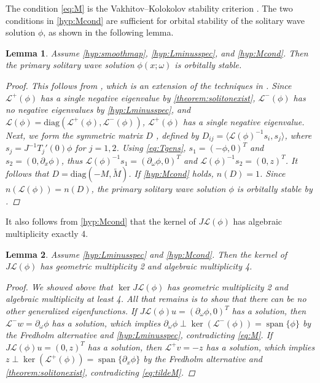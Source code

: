 \documentclass[12pt]{elsarticle}
\def\calL{{\mathcal L}}
\DeclareMathOperator{\spn}{span}
\newtheorem{lemma}{Lemma}
\begin{document}
The condition \cref{eq:M} is the Vakhitov–Kolokolov stability criterion \cite{Vakhitov1973}. The two conditions in \cref{hyp:Mcond} are sufficient for orbital stability of the solitary wave solution $\phi$, as shown in the following lemma.

\begin{lemma}\label{lemma:stability}
Assume \cref{hyp:smoothmap}, \cref{hyp:Lminusspec}, and \cref{hyp:Mcond}. Then the primary solitary wave solution $\phi(x; \omega)$ is orbitally stable.
\begin{proof}
This follows from \cite[Section 5.2.2]{Kapitula2013}, which is an extension of the techniques in \cite{Grillakis1990}. Since $\calL^+(\phi)$ has a single negative eigenvalue by \cref{theorem:solitonexist}, $\calL^-(\phi)$ has no negative eigenvalues by \cref{hyp:Lminusspec}, and $\calL(\phi) = \text{diag}(\calL^+(\phi), \calL^-(\phi))$, $\calL^+(\phi)$ has a single negative eigenvalue. Next, we form the symmetric matrix $D$ \cite[5.2.53]{Kapitula2013}, defined by 
$D_{ij} = \langle \calL(\phi)^{-1} s_i, s_j \rangle$, where $s_j = J^{-1} T_j'(0) \phi$ for $j = 1, 2$. Using \cref{eq:Tgens}, $s_1 = (-\phi, 0)^T$ and $s_2 = (0, \partial_x \phi)$, thus $\calL(\phi)^{-1} s_1 = (\partial_\omega \phi, 0)^T$ and $\calL(\phi)^{-1} s_2 = (0, z)^T$. It follows that $D = \text{diag}(-M, \tilde{M})$. If \cref{hyp:Mcond} holds, $n(D) = 1$. Since $n(\calL(\phi)) = n(D)$, the primary solitary wave solution $\phi$ is orbitally stable by \cite[Theorem5.2.11]{Kapitula2013}.
\end{proof}
\end{lemma}

It also follows from \cref{hyp:Mcond} that the kernel of $J \calL(\phi)$ has algebraic multiplicity exactly 4.

\begin{lemma}\label{lemma:kernelL}
Assume \cref{hyp:Lminusspec} and \cref{hyp:Mcond}. Then the kernel of $J \calL(\phi)$ has geometric multiplicity 2 and algebraic multiplicity 4.
\begin{proof}
We showed above that $\ker J \calL(\phi)$ has geometric multiplicity 2 and algebraic multiplicity at least 4. All that remains is to show that there can be no other generalized eigenfunctions. If $J \calL(\phi) u = (\partial_\omega \phi, 0)^T$ has a solution, then $\calL^- w = \partial_\omega \phi$ has a solution, which implies $\partial_\omega \phi \perp \ker(\calL^-(\phi)) = \spn\{\phi\}$ by the Fredholm alternative and \cref{hyp:Lminusspec}, contradicting \cref{eq:M}. If $J \calL(\phi) u = (0, z)^T$ has a solution, then $\calL^+ v = -z$ has a solution, which implies $z \perp \ker(\calL^+(\phi)) = \spn\{\partial_x \phi\}$ by the Fredholm alternative and \cref{theorem:solitonexist}, contradicting \cref{eq:tildeM}. 
\end{proof}
\end{lemma}
\end{document}
